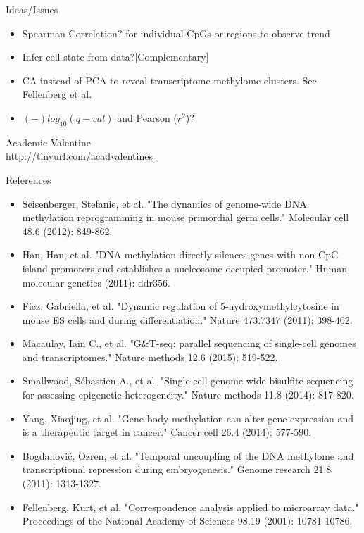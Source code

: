 \documentclass[10pt, compress]{beamer}
\renewcommand{\(}{\begin{columns}}
\renewcommand{\)}{\end{columns}}
\newcommand{\<}[1]{\begin{column}{#1}}
\renewcommand{\>}{\end{column}}
\begin{document}
\begin{frame}[fragile]
	\centering \Huge Ideas/Issues
	\Large \begin{itemize}
		\item Spearman Correlation? for individual CpGs or regions to observe trend
		\item Infer cell state from data?[Complementary]
		\item CA instead of PCA to reveal transcriptome-methylome clusters. See Fellenberg et al.
		\item  $(-)log_{10}(q-val)$ and Pearson ($r^2$)?
	\end{itemize}
\end{frame}


\begin{frame}[fragile]
	\begin{center} \Huge Academic Valentine\\
		\vspace*{20pt}
	\Large \color{blue}\underline{\url{http://tinyurl.com/acadvalentines}}
	\end{center}
\end{frame}

\begin{frame}[fragile]
	\centering \Large {References}
	\footnotesize
	\begin{itemize}
		\item Seisenberger, Stefanie, et al. "The dynamics of genome-wide DNA methylation reprogramming in mouse primordial germ cells." Molecular cell 48.6 (2012): 849-862.
		\item Han, Han, et al. "DNA methylation directly silences genes with non-CpG island promoters and establishes a nucleosome occupied promoter." Human molecular genetics (2011): ddr356.
		\item Ficz, Gabriella, et al. "Dynamic regulation of 5-hydroxymethylcytosine in mouse ES cells and during differentiation." Nature 473.7347 (2011): 398-402. 
		\item Macaulay, Iain C., et al. "G\&T-seq: parallel sequencing of single-cell genomes and transcriptomes." Nature methods 12.6 (2015): 519-522.
		\item Smallwood, Sébastien A., et al. "Single-cell genome-wide bisulfite sequencing for assessing epigenetic heterogeneity." Nature methods 11.8 (2014): 817-820.
		\item Yang, Xiaojing, et al. "Gene body methylation can alter gene expression and is a therapeutic target in cancer." Cancer cell 26.4 (2014): 577-590.
		\item Bogdanović, Ozren, et al. "Temporal uncoupling of the DNA methylome and transcriptional repression during embryogenesis." Genome research 21.8 (2011): 1313-1327.
		\item Fellenberg, Kurt, et al. "Correspondence analysis applied to microarray data." Proceedings of the National Academy of Sciences 98.19 (2001): 10781-10786.
	\end{itemize}
\end{frame}
\end{document}
